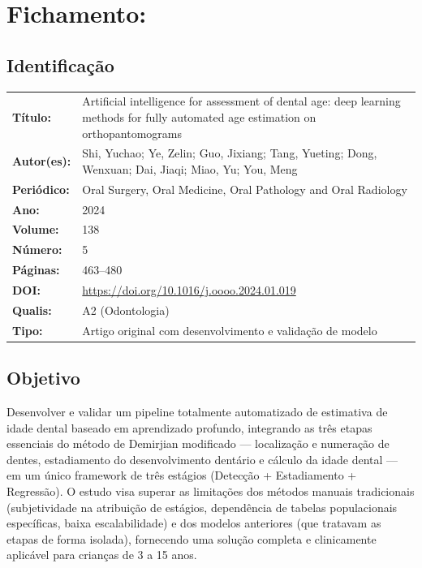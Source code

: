 \section{Fichamento: }

\subsection{Identificação}
\begin{tabular}{ll}
\textbf{Título:} & Artificial intelligence for assessment of dental age:
deep learning methods for fully automated age estimation on
orthopantomograms \\
\textbf{Autor(es):} & Shi, Yuchao; Ye, Zelin; Guo, Jixiang; Tang,
Yueting; Dong, Wenxuan; Dai, Jiaqi; Miao, Yu; You, Meng \\
\textbf{Periódico:} & Oral Surgery, Oral Medicine, Oral Pathology and Oral Radiology \\
\textbf{Ano:} & 2024 \\
\textbf{Volume:} & 138 \\
\textbf{Número:} & 5 \\
\textbf{Páginas:} & 463--480 \\
\textbf{DOI:} & \url{https://doi.org/10.1016/j.oooo.2024.01.019} \\
\textbf{Qualis:} & A2 (Odontologia) \\
\textbf{Tipo:} & Artigo original com desenvolvimento e validação de modelo \\
\end{tabular}

\subsection{Objetivo}
Desenvolver e validar um pipeline totalmente automatizado de estimativa
de idade dental baseado em aprendizado profundo, integrando as três
etapas essenciais do método de Demirjian modificado — localização e
numeração de dentes, estadiamento do desenvolvimento dentário e
cálculo da idade dental — em um único framework de três estágios
(Detecção + Estadiamento + Regressão). O estudo visa superar as
limitações dos métodos manuais tradicionais (subjetividade na
atribuição de estágios, dependência de tabelas populacionais
específicas, baixa escalabilidade) e dos modelos anteriores (que
tratavam as etapas de forma isolada), fornecendo uma solução
completa e clinicamente aplicável para crianças de 3 a 15 anos.

